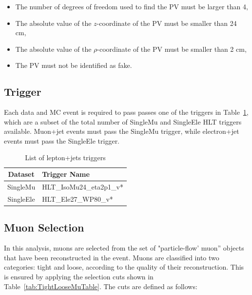 \begin{itemize}
  \item The number of degrees of freedom used to find the PV must be larger than 4,
  \item The absolute value of the \(z\)-coordinate of the PV must be smaller than 24 cm,
  \item The absolute value of the \(\rho\)-coordinate of the PV must
    be smaller than 2 cm,
  \item The PV must not be identified as fake.
\end{itemize}

\subsection{Trigger}
\label{trigger_overview}

\par Each data and MC event is required to pass passes one of the
triggers in Table~\ref{tab:LepJetTriggerTable}, which are a subset of the
total number of SingleMu and SingleEle HLT triggers available.  
Muon+jet events must pass the SingleMu trigger, while
electron+jet events must pass the SingleEle trigger.  

\begin{table}[hbtp]\footnotesize
\centering
\begin{tabular}{|c|l|}
\hline\hline
Dataset & Trigger Name \\
\hline
SingleMu & HLT\_IsoMu24\_eta2p1\_v* \\
\hline
SingleEle & HLT\_Ele27\_WP80\_v* \\
\hline\hline
\end{tabular}
\caption{List of lepton+jets triggers}
\label{tab:LepJetTriggerTable}
\end{table}


\subsection{Muon Selection}
\label{muon_selection_overview}

\par In this analysis, muons are selected from the set of
"particle-flow' muon'' objects that have been reconstructed in the
event.  Muons are classified into two categories: tight and loose,
according to the quality of their reconstruction.  This is ensured by
applying the selection cuts shown in
Table~\ref{tab:TightLooseMuTable}.  The cuts are defined as follows:

